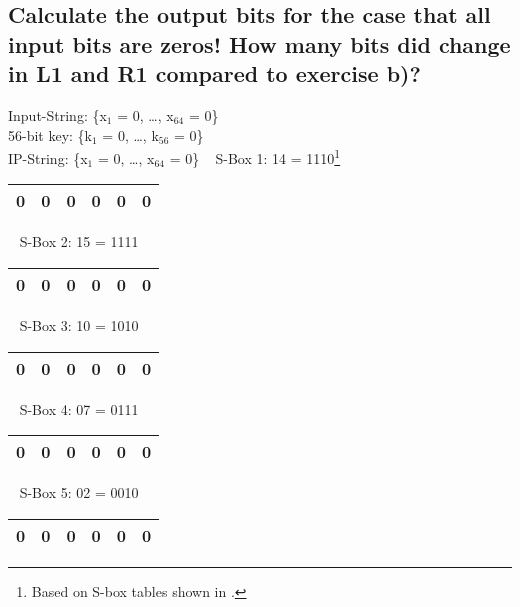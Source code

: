 \subsection{Calculate the output bits for the case that all input bits are zeros!  How many bits did change in L1 and R1 compared to exercise b)?}
\label{section:3c}
Input-String: \{x$_{1}$ = 0, \ldots, x$_{64}$ = 0\} \\
56-bit key: \{k$_{1}$ = 0, \ldots, k$_{56}$ = 0\} \\
IP-String: \{x$_{1}$ = 0, \ldots, x$_{64}$ = 0\} 
~
\vspace{1em}\newline
\noindent
S-Box 1: 14 = 1110\footnote{Based on S-box tables shown in \cite[p.~64-65]{Paar2010}.} \\
\begin{tabular}{ | l | l | l | l | l | l | } \hline 
	0 & 0 & 0 & 0 & 0 &  0 \\ \hline
\end{tabular}
~
\vspace{1em}\newline
\noindent
S-Box 2: 15 = 1111 \\
\begin{tabular}{ | l | l | l | l | l | l | } \hline 
	0 & 0 & 0 & 0 & 0 &  0 \\ \hline
\end{tabular}
~
\vspace{1em}\newline
\noindent
S-Box 3: 10 = 1010 \\
\begin{tabular}{ | l | l | l | l | l | l | } \hline 
	0 & 0 & 0 & 0 & 0 &  0 \\ \hline
\end{tabular}
~
\vspace{1em}\newline
\noindent
S-Box 4: 07 = 0111 \\
\begin{tabular}{ | l | l | l | l | l | l | } \hline 
	0 & 0 & 0 & 0 & 0 &  0 \\ \hline
\end{tabular}
~
\vspace{1em}\newline
\noindent
S-Box 5: 02 = 0010 \\
\begin{tabular}{ | l | l | l | l | l | l | } \hline 
	0 & 0 & 0 & 0 & 0 &  0 \\ \hline
\end{tabular}
